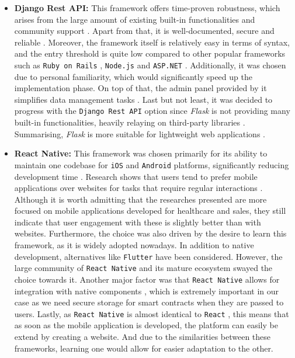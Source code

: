 \begin{itemize}
    \item \textbf{Django Rest API:} This framework offers time-proven robustness, which arises from the large amount of existing built-in functionalities and community support \cite{HillarEtAl2018}. Apart from that, it is well-documented, secure and reliable \cite{Ghimire2020, HillarEtAl2018}. Moreover, the framework itself is relatively easy in terms of syntax, and the entry threshold is quite low compared to other popular frameworks \cite{HillarEtAl2018, EliseevaEtAl2020, Plekhanova2009, Mao2018} such as \texttt{Ruby on Rails} \cite{LaurentEtAl2008}, \texttt{Node.js} \cite{Mead2018} and \texttt{ASP.NET} \cite{Ragupathi2016}. Additionally, it was chosen due to personal familiarity, which would significantly speed up the implementation phase. On top of that, the admin panel provided by it simplifies data management tasks \cite{HillarEtAl2018}. Last but not least, it was decided to progress with the \texttt{Django Rest API} option since \textit{Flask} is not providing many built-in functionalities, heavily relaying on third-party libraries \cite{ChanEtAl2019}. Summarising, \textit{Flask} is more suitable for lightweight web applications \cite{ChanEtAl2019}. 
    \item \textbf{React Native:} This framework was chosen primarily for its ability to maintain one codebase for \texttt{iOS} and \texttt{Android} platforms, significantly reducing development time \cite{MasielloEtAl2017}. Research shows that users tend to prefer mobile applications over websites for tasks that require regular interactions \cite{TurnerMcGrievyEtAl2016, TupikovskajaOmovieEtAl2015, AlmarashdehEtAL2019, Warcholinski2024}. Although it is worth admitting that the researches presented are more focused on mobile applications developed for healthcare and sales, they still indicate that user engagement with these is slightly better than with websites. Furthermore, the choice was also driven by the desire to learn this framework, as it is widely adopted nowadays. In addition to native development, alternatives like \texttt{Flutter} have been considered. However, the large community of \texttt{React Native} and its mature ecosystem \cite{Wu2018, Boduch2017} swayed the choice towards it. Another major factor was that \texttt{React Native} allows for integration with native components \cite{Boduch2017}, which is extremely important in our case as we need secure storage for smart contracts when they are passed to users. Lastly, as \texttt{React Native} is almost identical to \texttt{React} \cite{Boduch2017}, this means that as soon as the mobile application is developed, the platform can easily be extend by creating a website. And due to the similarities between these frameworks, learning one would allow for easier adaptation to the other.
\end{itemize}

